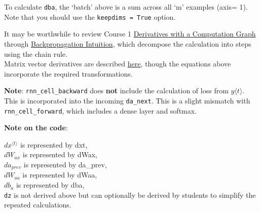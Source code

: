\documentclass[11pt]{article}
\begin{document}
To calculate \texttt{dba}, the `batch' above is a sum across all `m'
examples (axis= 1). Note that you should use the
\texttt{keepdims\ =\ True} option.

It may be worthwhile to review Course 1
\href{https://www.coursera.org/learn/neural-networks-deep-learning/lecture/0VSHe/derivatives-with-a-computation-graph}{Derivatives
with a Computation Graph} through
\href{https://www.coursera.org/learn/neural-networks-deep-learning/lecture/6dDj7/backpropagation-intuition-optional}{Backpropagation
Intuition}, which decompose the calculation into steps using the chain
rule.\\
Matrix vector derivatives are described
\href{http://cs231n.stanford.edu/vecDerivs.pdf}{here}, though the
equations above incorporate the required transformations.

\textbf{Note}: \texttt{rnn\_cell\_backward} does \textbf{not} include
the calculation of loss from \(y \langle t \rangle\). This is
incorporated into the incoming \texttt{da\_next}. This is a slight
mismatch with \texttt{rnn\_cell\_forward}, which includes a dense layer
and softmax.

\textbf{Note on the code}:

\(\displaystyle dx^{\langle t \rangle}\) is represented by dxt,\\
\(\displaystyle d W_{ax}\) is represented by dWax,\\
\(\displaystyle da_{prev}\) is represented by da\_prev,\\
\(\displaystyle dW_{aa}\) is represented by dWaa,\\
\(\displaystyle db_{a}\) is represented by dba,\\
\texttt{dz} is not derived above but can optionally be derived by
students to simplify the repeated calculations.
\end{document}

